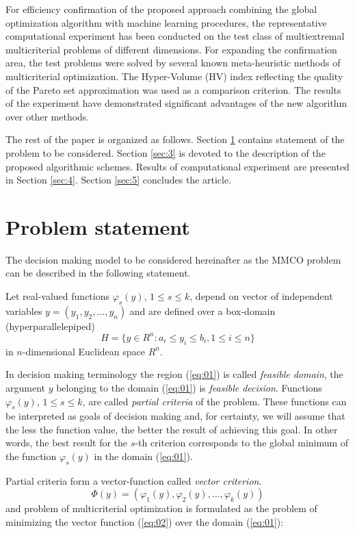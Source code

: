 \documentclass[runningheads]{llncs}
\begin{document}
For efficiency confirmation of the proposed approach combining the global optimization algorithm with machine learning procedures, the representative computational experiment has been conducted on the test class of multiextremal multicriterial problems of different dimensions. For expanding the confirmation area, the test problems were solved by several known meta-heuristic methods of multicriterial optimization. The Hyper-Volume (HV) index reflecting the quality of the Pareto set approximation was used as a comparison criterion. The results of the experiment have demonstrated significant advantages of the new algorithm over other methods.

The rest of the paper is organized as follows. Section \ref{sec:2} contains statement of the problem to be considered. Section \ref{sec:3} is devoted to the description of the proposed algorithmic schemes.  Results of computational experiment are presented in Section \ref{sec:4}. Section \ref{sec:5} concludes the article.

\section{Problem statement}\label{sec:2}

The decision making model to be considered hereinafter as the MMCO problem can be described in the following statement.

Let real-valued functions $\varphi_s(y)$, $1 \leq s \leq k$, depend on vector of independent variables 
$y=(y_1, y_2, \dots, y_n)$ and are defined over a box-domain (hyperparallelepiped)
\begin{equation}
\label{eq:01}
    H=\{y \in R^n : a_i \leq y_i \leq b_i, 1 \leq i \leq n\}
\end{equation}                                      in $n$-dimensional Euclidean space $R^n$.

In decision making terminology the region (\ref{eq:01}) is called \textit{feasible domain}, the argument $y$ belonging to the domain (\ref{eq:01}) is \textit{feasible decision}.  Functions  $\varphi_s(y)$, $1 \leq s \leq k$, are called \textit{partial criteria} of the problem. These functions can be interpreted as goals of decision making and, for certainty, we will assume that the less the function value, the better the result of achieving this goal. In other words, the best result for the $s$-th criterion corresponds to the global minimum of the function $\varphi_s(y)$ in the domain (\ref{eq:01}).

Partial criteria form a vector-function called \textit{vector criterion}. 
\begin{equation}
\label{eq:02}
    \Phi(y) = (\varphi_1(y), \varphi_2(y), \dots, \varphi_k(y))
\end{equation}
and problem of multicriterial optimization is formulated as the problem of minimizing the vector function (\ref{eq:02}) over the domain (\ref{eq:01}):
\end{document}
